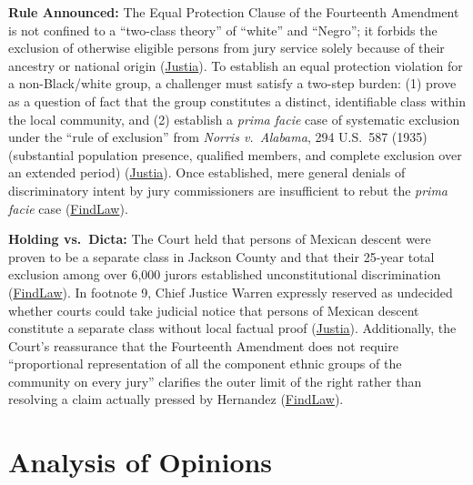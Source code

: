 \documentclass[12pt]{article}
\begin{document}
\textbf{Rule Announced:} The Equal Protection Clause of the Fourteenth Amendment is not confined to a ``two-class theory'' of ``white'' and ``Negro''; it forbids the exclusion of otherwise eligible persons from jury service solely because of their ancestry or national origin (\href{https://supreme.justia.com/cases/federal/us/347/475/}{Justia}). To establish an equal protection violation for a non-Black/white group, a challenger must satisfy a two-step burden: (1) prove as a question of fact that the group constitutes a distinct, identifiable class within the local community, and (2) establish a \textit{prima facie} case of systematic exclusion under the ``rule of exclusion'' from \textit{Norris v.\ Alabama}, 294 U.S.\ 587 (1935) (substantial population presence, qualified members, and complete exclusion over an extended period) (\href{https://supreme.justia.com/cases/federal/us/347/475/}{Justia}). Once established, mere general denials of discriminatory intent by jury commissioners are insufficient to rebut the \textit{prima facie} case (\href{https://caselaw.findlaw.com/court/us-supreme-court/347/475.html}{FindLaw}).

\textbf{Holding vs.\ Dicta:} The Court held that persons of Mexican descent were proven to be a separate class in Jackson County and that their 25-year total exclusion among over 6,000 jurors established unconstitutional discrimination (\href{https://caselaw.findlaw.com/court/us-supreme-court/347/475.html}{FindLaw}). In footnote 9, Chief Justice Warren expressly reserved as undecided whether courts could take judicial notice that persons of Mexican descent constitute a separate class without local factual proof (\href{https://supreme.justia.com/cases/federal/us/347/475/}{Justia}). Additionally, the Court's reassurance that the Fourteenth Amendment does not require ``proportional representation of all the component ethnic groups of the community on every jury'' clarifies the outer limit of the right rather than resolving a claim actually pressed by Hernandez (\href{https://caselaw.findlaw.com/court/us-supreme-court/347/475.html}{FindLaw}).

\section{Analysis of Opinions}
\end{document}
